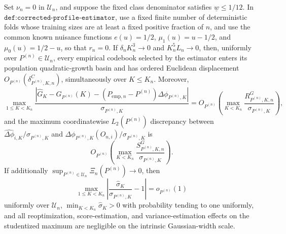 Set \(\nu_n=0\) in \(\mathcal U_n\), and suppose the fixed class denominator satisfies \(\underline w\leq1/12\).  In \(\texttt{def:corrected-profile-estimator}\), use a fixed finite number of deterministic folds whose training sizes are at least a fixed positive fraction of \(n\), and use the common known nuisance functions \(e(u)=1/2\), \(\mu_1(u)=u-1/2\), and \(\mu_0(u)=1/2-u\), so that \(r_n=0\).  If \(\delta_nK_n^3\to0\) and \(K_n^5L_n\to0\), then, uniformly over \(P^{(n)}\in\mathcal U_n\), every empirical codebook selected by the estimator enters its population quadratic-growth basin and has ordered Euclidean displacement \(O_{P^{(n)}}(\delta^C_{P^{(n)},K,n})\), simultaneously over \(K\leq K_n\).  Moreover,
\[
 \max_{1\leq K<K_n}\frac{|\widehat G_K-G_{P^{(n)}}(K)-(P_{\mathrm{emp},n}-P^{(n)})\Delta\phi_{P^{(n)},K}|}{\sigma_{P^{(n)},K}}
 =O_{P^{(n)}}\!\left(\max_{K<K_n}\frac{R^G_{P^{(n)},K,n}}{\sigma_{P^{(n)},K}}\right),
\]
and the maximum coordinatewise \(L_2(P^{(n)})\) discrepancy between \(\widehat{\Delta\phi}_{i,K}/\sigma_{P^{(n)},K}\) and \(\Delta\phi_{P^{(n)},K}(O_{n,i})/\sigma_{P^{(n)},K}\) is
\[
 O_{P^{(n)}}\!\left(\max_{K<K_n}\frac{S^G_{P^{(n)},K,n}}{\sigma_{P^{(n)},K}}\right).
\]
If additionally \(\sup_{P^{(n)}\in\mathcal U_n}\Xi_n(P^{(n)})\to0\), then
\[
 \max_{1\leq K<K_n}\left|\frac{\widehat\sigma_K}{\sigma_{P^{(n)},K}}-1\right|=o_{P^{(n)}}(1)
\]
uniformly over \(\mathcal U_n\), \(\min_{K<K_n}\widehat\sigma_K>0\) with probability tending to one uniformly, and all reoptimization, score-estimation, and variance-estimation effects on the studentized maximum are negligible on the intrinsic Gaussian-width scale.
